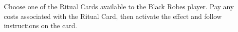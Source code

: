 Choose one of the Ritual Cards available to the Black Robes player. Pay any costs associated with the Ritual Card, then activate the effect and follow instructions on the card.
